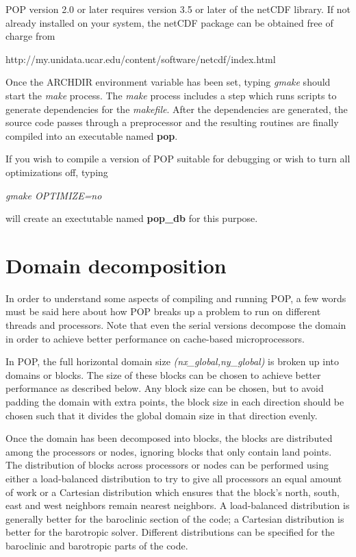 POP version 2.0 or later requires version 3.5 or later of the 
netCDF library.  If not already installed on your system, the 
netCDF package can be obtained free of charge from

\noindent
{}
{http://my.unidata.ucar.edu/content/software/netcdf/index.html}
\noindent

Once the ARCHDIR environment variable has been set, typing {\em gmake}
should start the {\em make} process. The {\em make} process includes a
step which runs scripts to generate dependencies for the {\em makefile}.
After the dependencies are generated, the source code passes through a
preprocessor and the resulting routines are finally compiled into an
executable named {\bf pop}.

If you wish to compile a version of POP suitable for
debugging or wish to turn all optimizations off, typing

{\em gmake OPTIMIZE=no}

\noindent
will create an exectutable named {\bf pop\_db} for this
purpose.

\section{Domain decomposition}\label{sec:domain-decomp}

In order to understand some aspects of compiling and running
POP, a few words must be said here about how POP breaks up
a problem to run on different threads and processors.  Note
that even the serial versions decompose the domain in order
to achieve better performance on cache-based microprocessors.

In POP, the full horizontal domain size 
{\em (nx\_global,ny\_global)} is broken up into domains 
or blocks. The size of these blocks can be chosen to 
achieve better performance as described below.  Any block 
size can be chosen, but to avoid padding the domain with 
extra points, the block size in each direction should be 
chosen such that it divides the global domain size in that 
direction evenly.

Once the domain has been decomposed into blocks, the
blocks are distributed among the processors or nodes, ignoring
blocks that only contain land points.  The distribution
of blocks across processors or nodes can be performed using 
either a load-balanced distribution to try to give all processors
an equal amount of work or a Cartesian distribution
which ensures that the block's north, south, east and
west neighbors remain nearest neighbors.  A
load-balanced distribution is generally better for
the baroclinic section of the code; a Cartesian
distribution is better for the barotropic solver.
Different distributions can be specified for the baroclinic
and barotropic parts of the code.

